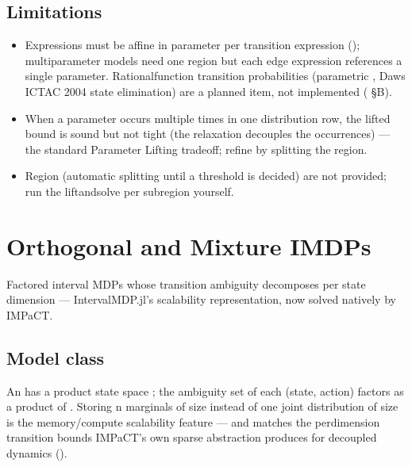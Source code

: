 \documentclass[a4paper,10pt,english]{sphinxmanual}
\begin{document}
\subsection{Limitations}
\label{\detokenize{manual/parametric:limitations}}\begin{itemize}
\item {} 
\sphinxAtStartPar
Expressions must be affine in  parameter per transition expression
(); multi\sphinxhyphen{}parameter models need one  region but each edge
expression references a single parameter. Rational\sphinxhyphen{}function transition
probabilities (parametric , Daws ICTAC 2004 state elimination)
are a planned item, not implemented ( \S{}B).

\item {} 
\sphinxAtStartPar
When a parameter occurs multiple times in one distribution row, the lifted bound is
sound but not tight (the relaxation decouples the occurrences) — the standard
Parameter Lifting trade\sphinxhyphen{}off; refine by splitting the region.

\item {} 
\sphinxAtStartPar
Region  (automatic splitting until a threshold is decided) are not
provided; run the lift\sphinxhyphen{}and\sphinxhyphen{}solve per subregion yourself.

\end{itemize}

\sphinxstepscope


\section{Orthogonal and Mixture IMDPs}
\label{\detokenize{manual/odimdp:orthogonal-and-mixture-imdps}}\label{\detokenize{manual/odimdp::doc}}
\sphinxAtStartPar
Factored interval MDPs whose transition ambiguity decomposes per state dimension —
IntervalMDP.jl’s scalability representation, now solved natively by IMPaCT.


\subsection{Model class}
\label{\detokenize{manual/odimdp:model-class}}
\sphinxAtStartPar
An  has a product state space
; the ambiguity set of each (state, action) factors as a product
of . Storing n marginals of size
 instead of one joint distribution of size  is the memory/compute
scalability feature — and matches the per\sphinxhyphen{}dimension transition bounds IMPaCT’s own
sparse abstraction produces for decoupled dynamics ().
\end{document}
